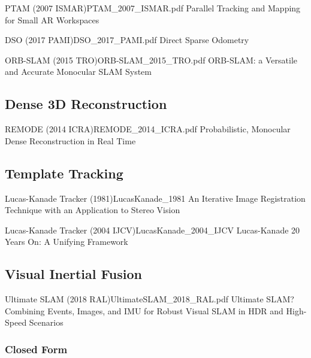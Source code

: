 \documentclass[10pt,a4paper]{scrartcl}
\begin{document}
\begin{multicols*}{2}
\begin{Paper}{PTAM (2007 ISMAR)}{PTAM_2007_ISMAR.pdf}
Parallel Tracking and Mapping for Small AR Workspaces
\end{Paper}

\begin{Paper}{DSO (2017 PAMI)}{DSO_2017_PAMI.pdf}
Direct Sparse Odometry
\end{Paper}

\begin{Paper}{ORB-SLAM (2015 TRO)}{ORB-SLAM_2015_TRO.pdf}
ORB-SLAM: a Versatile and Accurate Monocular SLAM System
\end{Paper}

\subsection{Dense 3D Reconstruction}

\begin{Paper}{REMODE (2014 ICRA)}{REMODE_2014_ICRA.pdf}
Probabilistic, Monocular Dense Reconstruction in Real Time
\end{Paper}

\subsection{Template Tracking}

\begin{Paper}{Lucas-Kanade Tracker (1981)}{LucasKanade_1981}
An Iterative Image Registration Technique with an Application to Stereo Vision
\end{Paper}

\begin{Paper}{Lucas-Kanade Tracker (2004 IJCV)}{LucasKanade_2004_IJCV}
Lucas-Kanade 20 Years On: A Unifying Framework
\end{Paper}

\subsection{Visual Inertial Fusion}

\begin{Paper}{Ultimate SLAM (2018 RAL)}{UltimateSLAM_2018_RAL.pdf}
Ultimate SLAM? Combining Events, Images, and IMU for Robust Visual SLAM in HDR and High-Speed Scenarios
\end{Paper}

\subsubsection{Closed Form}


\end{multicols*}
\end{document}
